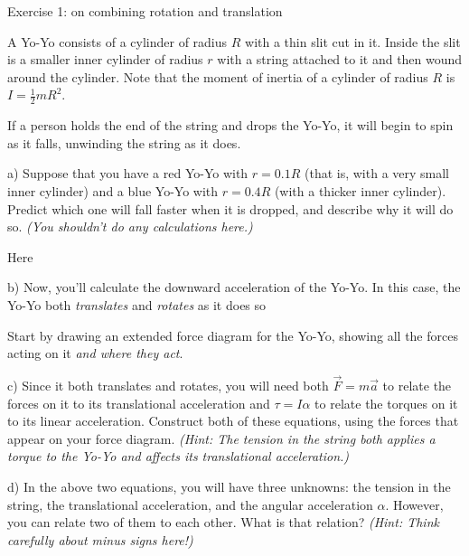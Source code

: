 \documentclass[12pt]{article}
\begin{document}
\Large
\centerline{}
\normalsize
\centerline{}

\begin{center}
	\Large Exercise 1: on combining rotation and translation
\end{center}

A Yo-Yo consists of a cylinder of radius $R$ with a thin slit cut in it. Inside the slit is a smaller inner cylinder of radius $r$ with a string attached to it and then wound around the cylinder. Note that the moment of inertia of a cylinder of radius $R$ is $I=\frac{1}{2}mR^2$.

If a person holds the end of the string and drops the Yo-Yo, it will begin to spin as it falls, unwinding the string as it does. 


a) Suppose that you have a red Yo-Yo with $r=0.1 R$ (that is, with a very small inner cylinder) and a blue Yo-Yo with $r=0.4 R$ (with a thicker inner cylinder). Predict which one will fall faster when it is dropped, and describe why it will do so. \textit{(You shouldn't do any calculations here.)}

{\color{red} Here 

\vspace{2in}

b) Now, you'll calculate the downward acceleration of the Yo-Yo. In this case, the Yo-Yo both {\it translates} and {\it rotates} as it does so

Start by drawing an extended force diagram for the Yo-Yo, showing all the forces acting on it {\it and where they act}.

\vspace{2in}

\newpage

c) Since it both translates and rotates, you will need both $\vec F = m \vec a$ to relate the forces on it to its translational acceleration and $\tau = I \alpha$ to relate the torques on it to its linear acceleration. Construct both of these equations, using the forces that appear on your force diagram. \textit{(Hint: The tension in the string both applies a torque to the Yo-Yo and affects its translational acceleration.)}

\vspace{2.5in}

d) In the above two equations, you will have three unknowns: the tension in the string, the translational acceleration, and the angular acceleration $\alpha$. However, you can relate two of them to each other. What is that relation? \textit{(Hint: Think carefully about minus signs here!)}}
\end{document}
